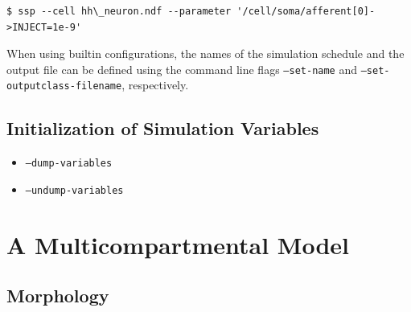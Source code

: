 \documentclass[12pt]{article}
\begin{document}
\begin{verbatim}
$ ssp --cell hh\_neuron.ndf --parameter '/cell/soma/afferent[0]->INJECT=1e-9'
\end{verbatim}







When using builtin configurations, the names of the simulation
schedule and the output file can be defined using the command line
flags {\tt --set-name} and {\tt --set-outputclass-filename},
respectively.

\subsection{Initialization of Simulation Variables}

\begin{itemize}
\item {\tt --dump-variables}
\item {\tt --undump-variables}
\end{itemize}

\section{A Multicompartmental Model}
\label{sec:multi-comp}

\subsection{Morphology}
\end{document}
